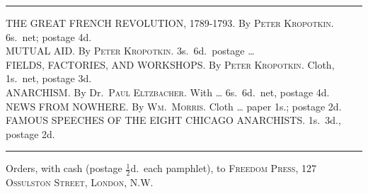 \documentclass[oneside]{book}
\newcommand{\SingleLine}{%
\medskip
\begin{center}\rule{1in}{0.5pt}\end{center}
\medskip
}
\begin{document}
\SingleLine

\noindent THE GREAT FRENCH REVOLUTION, 1789-1793. By \textsc{Peter Kro\-pot\-kin}.\\
\indent 6s.\ net; postage 4d.\\
MUTUAL AID\@. By \textsc{Peter Kropotkin}. 3s.\ 6d.\ postage \dots\\
FIELDS, FACTORIES, AND WORKSHOPS\@. By \textsc{Peter Kro\-pot\-kin}. Cloth,\\
\indent 1s.\ net, postage 3d.\\
ANARCHISM\@. By Dr.\ \textsc{Paul Eltzbacher}. With \dots
6s.\ 6d.\ net, postage 4d.\\
NEWS FROM NOWHERE\@. By \textsc{Wm.\ Morris}. Cloth \dots
paper 1s.; postage 2d.\\
FAMOUS SPEECHES OF THE EIGHT CHICAGO ANARCH\-ISTS. 1s.\ 3d.,\\
\indent postage 2d.

\SingleLine

Orders, with cash (postage $\tfrac{1}{2}$d.\ each pamphlet), to
\textsc{Freedom Press, 127 Ossulston Street, London, N.W.}
\end{document}
